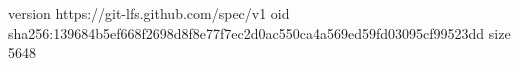 version https://git-lfs.github.com/spec/v1
oid sha256:139684b5ef668f2698d8f8e77f7ec2d0ac550ca4a569ed59fd03095cf99523dd
size 5648

